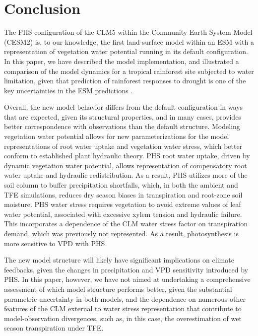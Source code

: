 \documentclass[draft,linenumbers]{agujournal}
\begin{document}
\section{Conclusion}

    The PHS configuration of the CLM5 within the Community Earth System Model (CESM2) is, to our knowledge, the first land-surface model within an ESM with a representation of vegetation water potential running in its default configuration. In this paper, we have described the model implementation, and illustrated a comparison of the model dynamics for a tropical rainforest site subjected to water limitation, given that prediction of rainforest responses to drought is one of the key uncertainties in the ESM predictions \citep{huntingford2013}. 
    
    Overall, the new model behavior differs from the default configuration in ways that are expected, given its structural properties, and in many cases, provides better correspondence with observations than the default structure. Modeling vegetation water potential allows for new parameterizations for the model representations of root water uptake and vegetation water stress, which better conform to established plant hydraulic theory. PHS root water uptake, driven by dynamic vegetation water potential, allows representation of compensatory root water uptake and hydraulic redistribution. As a result, PHS utilizes more of the soil column to buffer precipitation shortfalls, which, in both the ambient and TFE simulations, reduces dry season biases in transpiration and root-zone soil moisture.
    PHS water stress requires vegetation to avoid extreme values of leaf water potential, associated with excessive xylem tension and hydraulic failure. This incorporates a dependence of the CLM water stress factor on transpiration demand, which was previously not represented. As a result, photosynthesis is more sensitive to VPD with PHS.
    
The new model structure will likely have significant implications on climate feedbacks, given the changes in precipitation and VPD sensitivity introduced by PHS. In this paper, however, we have not aimed at undertaking a comprehensive assessment of which model structure performs better, given the substantial parametric uncertainty in both models, and the dependence on numerous other features of the CLM external to water stress representation that contribute to model-observation divergences, such as, in this case, the overestimation of wet season transpiration under TFE. 
    
\end{document}

